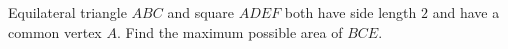 Equilateral triangle $ABC$ and square $ADEF$ both have side length $2$ and have a common vertex $A$. Find the maximum possible area of $BCE$.
